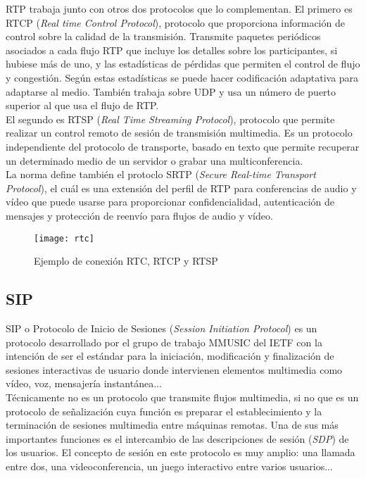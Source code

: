 RTP trabaja junto con otros dos protocolos que lo complementan. El primero es RTCP (\emph{Real time Control Protocol}), protocolo que proporciona información de control sobre la calidad de la transmisión. Transmite paquetes periódicos asociados a cada flujo RTP que incluye los detalles sobre los participantes, si hubiese más de uno, y las estadísticas de pérdidas que permiten el control de flujo y congestión. Según estas estadísticas se puede hacer codificación adaptativa para adaptarse al medio. También trabaja sobre UDP y usa un número de puerto superior al que usa el flujo de RTP.\\

El segundo es RTSP (\emph{Real Time Streaming Protocol}), protocolo que permite realizar un control remoto de sesión de transmisión multimedia. Es un protocolo independiente del protocolo de transporte, basado en texto que permite recuperar un determinado medio de un servidor o grabar una multiconferencia.\\

La norma define también el protoclo SRTP (\emph{Secure Real-time Transport Protocol}), el cuál es una extensión del perfil de RTP para conferencias de audio y vídeo que puede usarse para proporcionar confidencialidad, autenticación de mensajes y protección de reenvío para flujos de audio y vídeo.\\


\begin{figure}[h!]
\centering
\texttt{[image: rtc]}
\caption{Ejemplo de conexión RTC, RTCP y RTSP}
\label{fig:rtc}
\end{figure}


\subsection{SIP}

SIP o Protocolo de Inicio de Sesiones (\emph{Session Initiation Protocol}) es un protocolo desarrollado por el grupo de trabajo MMUSIC del IETF con la intención de ser el estándar para la iniciación, modificación y finalización de sesiones interactivas de usuario donde intervienen elementos multimedia como vídeo, voz, mensajería instantánea...\\

Técnicamente no es un protocolo que transmite flujos multimedia, si no que es un protocolo de señalización cuya función es preparar el establecimiento y la terminación de sesiones multimedia entre máquinas remotas. Una de sus más importantes funciones es el intercambio de las descripciones de sesión (\emph{SDP}) de los usuarios. El concepto de sesión en este protocolo es muy amplio: una llamada entre dos, una videoconferencia, un juego interactivo entre varios usuarios...\\

